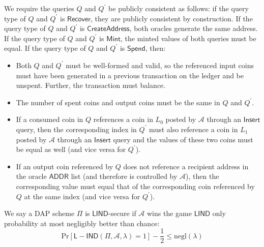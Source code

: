 \documentclass{llncs}
\newcommand{\func}[1]{\mathsf{#1}}
\begin{document}
We require the queries $Q$ and $Q^\prime$ be publicly consistent as follows: if the query type of $Q$ and $Q^\prime$ is $\func{Recover}$, they are publicly consistent by construction.
If the query type of $Q$ and $Q^\prime$ is $\func{CreateAddress}$, both oracles generate the same address.
If the query type of $Q$ and $Q^\prime$ is $\func{Mint}$, the minted values of both queries must be equal.
If the query type of $Q$ and $Q^\prime$ is $\func{Spend}$, then:
\begin{itemize}
    \item Both $Q$ and $Q^\prime$ must be well-formed and valid, so the referenced input coins must have been generated in a previous transaction on the ledger and be unspent.
    Further, the transaction must balance.
    \item The number of spent coins and output coins must be the same in $Q$ and $Q^\prime$.
    \item If a consumed coin in $Q$ references a coin in $L_0$ posted by $\mathcal{A}$ through an $\func{Insert}$ query, then the corresponding index in $Q^\prime$ must also reference a coin in $L_1$ posted by $\mathcal{A}$ through an $\func{Insert}$ query and the values of these two coins must be equal as well (and vice versa for $Q^\prime$). 
    \item If an output coin referenced by $Q$ does not reference a recipient address in the oracle $\func{ADDR}$ list (and therefore is controlled by $\mathcal{A}$), then the corresponding value must equal that of the corresponding coin referenced by $Q$ at the same index (and vice versa for $Q^\prime$).
\end{itemize}

We say a DAP scheme $\Pi$ is $\func{LIND}$-secure if $\mathcal{A}$ wins the game $\func{LIND}$ only probability at most negligibly better than chance:
$$\text{Pr}[\func{L-IND}(\Pi, \mathcal{A}, \lambda) = 1] - \frac{1}{2} \leq \text{negl}(\lambda)$$
\end{document}
